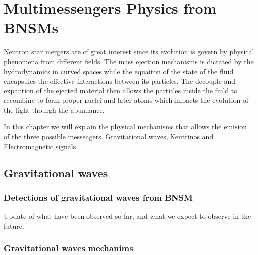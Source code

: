 

\chapter{Multimessengers Physics from BNSMs}

Neutron star mergers are of great interest since its evolution is govern by physical phenomena from different fields.
The mass ejection mechanisms is dictated by the hydrodynamics in curved spaces while the equaiton of the state of the fluid encapsules the effective interactions between its particles.
The decouple and expantion of the ejected material then allows the particles inside the fuild to recombine to form proper nuclei and later atoms which impacts the evolution of the light thourgh the abundance.

In this chapter we will explain the physical mechanisms that allows the emision of the three possible messengers. Gravitational waves, Neutrinos and Electromagnetic signals

\section[Gravitational waves]{Gravitational waves}

\subsection[Detections of Gravitational waves from BNSM]{Detections of gravitational waves from BNSM}
Update of what have been observed so far, and what we expect to observe in the future.
\subsection[Gravitational waves mechanims]{Gravitational waves mechanims}

